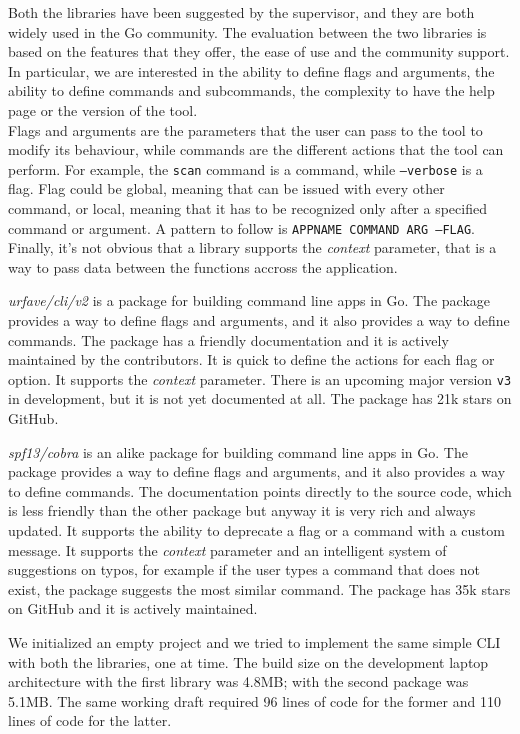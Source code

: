 Both the libraries have been suggested by the supervisor, and they are both widely used in the Go community. The evaluation between the two libraries is based on the features that they offer, the ease of use and the community support. In particular, we are interested in the ability to define flags and arguments, the ability to define commands and subcommands, the complexity to have the help page or the version of the tool.\\
Flags and arguments are the parameters that the user can pass to the tool to modify its behaviour, while commands are the different actions that the tool can perform. For example, the \texttt{scan} command is a command, while \texttt{--verbose} is a flag. Flag could be global, meaning that can be issued with every other command, or local, meaning that it has to be recognized only after a specified command or argument. A pattern to follow is \texttt{APPNAME COMMAND ARG --FLAG}. Finally, it's not obvious that a library supports the \textit{context} parameter, that is a way to pass data between the functions accross the application.

\textit{urfave/cli/v2} is a package for building command line apps in Go. The package provides a way to define flags and arguments, and it also provides a way to define commands. The package has a friendly documentation and it is actively maintained by the contributors. It is quick to define the actions for each flag or option. It supports the \textit{context} parameter. There is an upcoming major version \texttt{v3} in development, but it is not yet documented at all. The package has 21k stars on GitHub.

\textit{spf13/cobra} is an alike package for building command line apps in Go. The package provides a way to define flags and arguments, and it also provides a way to define commands. The documentation points directly to the source code, which is less friendly than the other package but anyway it is very rich and always updated. It supports the ability to deprecate a flag or a command with a custom message. It supports the \textit{context} parameter and an intelligent system of suggestions on typos, for example if the user types a command that does not exist, the package suggests the most similar command. The package has 35k stars on GitHub and it is actively maintained.

We initialized an empty project and we tried to implement the same simple CLI with both the libraries, one at time. The build size on the development laptop architecture with the first library was 4.8MB; with the second package was 5.1MB. The same working draft required 96 lines of code for the former and 110 lines of code for the latter.

